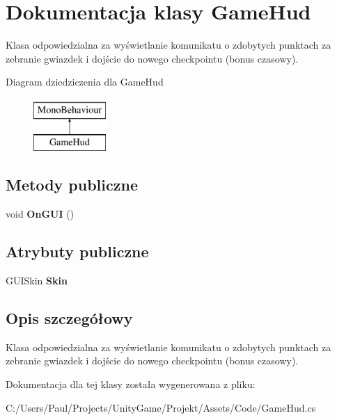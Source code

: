 \section{Dokumentacja klasy Game\+Hud}
\label{class_game_hud}


Klasa odpowiedzialna za wyświetlanie komunikatu o zdobytych punktach za zebranie gwiazdek i dojście do nowego checkpointu (bonus czasowy).  


Diagram dziedziczenia dla Game\+Hud\begin{figure}[H]
\begin{center}
\leavevmode
\includegraphics[height=2.000000cm]{class_game_hud}
\end{center}
\end{figure}
\subsection*{Metody publiczne}
\begin{DoxyCompactItemize}
\item 
void {\bfseries On\+G\+U\+I} ()\label{class_game_hud_a9b3a0ab6fe0867aafb05c2aab0f9590c}

\end{DoxyCompactItemize}
\subsection*{Atrybuty publiczne}
\begin{DoxyCompactItemize}
\item 
G\+U\+I\+Skin {\bfseries Skin}\label{class_game_hud_a40a8fcd77291bc5080b12cfc89f28a4a}

\end{DoxyCompactItemize}


\subsection{Opis szczegółowy}
Klasa odpowiedzialna za wyświetlanie komunikatu o zdobytych punktach za zebranie gwiazdek i dojście do nowego checkpointu (bonus czasowy). 



Dokumentacja dla tej klasy została wygenerowana z pliku\+:\begin{DoxyCompactItemize}
\item 
C\+:/\+Users/\+Paul/\+Projects/\+Unity\+Game/\+Projekt/\+Assets/\+Code/Game\+Hud.\+cs\end{DoxyCompactItemize}
